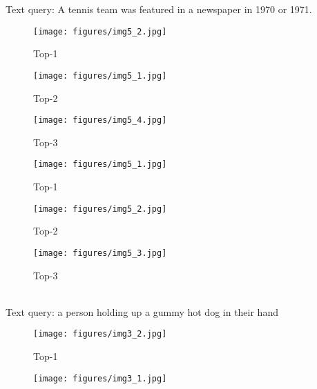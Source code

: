 \documentclass[10pt,twocolumn,letterpaper]{article}
\begin{document}
\begin{figure*}[ht]
  \footnotesize{Text query: A tennis team was featured in a newspaper in 1970 or 1971.}\\
  \begin{subfigure}{.1585\textwidth}
    \centering
    \texttt{[image: figures/img5\_2.jpg]}
    \caption{Top-1 \textcolor{blue}{\XSolidBrush}}
    \label{sf1}
  \end{subfigure}
  \begin{subfigure}{.1585\textwidth}
    \centering
    \texttt{[image: figures/img5\_1.jpg]}
    \caption{Top-2 \textcolor{red}{\CheckmarkBold}}
    \label{sf2}
  \end{subfigure}
  \begin{subfigure}{.1585\textwidth}
    \centering
    \texttt{[image: figures/img5\_4.jpg]}
    \caption{Top-3 \textcolor{blue}{\XSolidBrush}}
    \label{sf2}
  \end{subfigure}
  \hspace{2mm}
  \begin{subfigure}{.1585\textwidth}
    \centering
    \texttt{[image: figures/img5\_1.jpg]}
    \caption{Top-1 \textcolor{red}{\CheckmarkBold}}
    \label{sf1}
  \end{subfigure}
  \begin{subfigure}{.1585\textwidth}
    \centering
    \texttt{[image: figures/img5\_2.jpg]}
    \caption{Top-2 \textcolor{blue}{\XSolidBrush}}
    \label{sf2}
  \end{subfigure}
  \begin{subfigure}{.1585\textwidth}
    \centering
    \texttt{[image: figures/img5\_3.jpg]}
    \caption{Top-3 \textcolor{blue}{\XSolidBrush}}
    \label{sf2}
  \end{subfigure}\vspace{0.5em}\\
\footnotesize{Text query: a person holding up a gummy hot dog in their hand}\\
  \begin{subfigure}{.1585\textwidth}
    \centering
    \texttt{[image: figures/img3\_2.jpg]}
    \caption{Top-1 \textcolor{blue}{\XSolidBrush}}
    \label{sf1}
  \end{subfigure}
  \begin{subfigure}{.1585\textwidth}
    \centering
    \texttt{[image: figures/img3\_1.jpg]}

\end{subfigure}
\end{figure*}
\end{document}
